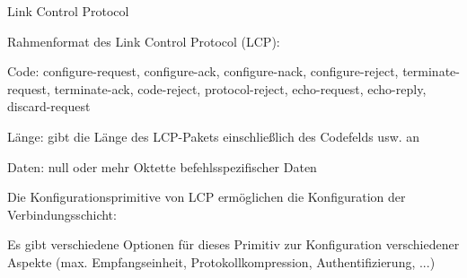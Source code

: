 \documentclass[a4paper]{article}
\begin{document}
\begin{multicols}{3}
      Link Control Protocol
      \begin{itemize*}
            \item Rahmenformat des Link Control Protocol (LCP):
            \begin{itemize*}
                  \item Code: configure-request, configure-ack, configure-nack, configure-reject, terminate-request, terminate-ack, code-reject, protocol-reject, echo-request, echo-reply, discard-request
                  \item Länge: gibt die Länge des LCP-Pakets einschließlich des Codefelds usw. an
                  \item Daten: null oder mehr Oktette befehlsspezifischer Daten
            \end{itemize*}
            \item Die Konfigurationsprimitive von LCP ermöglichen die Konfiguration der
            Verbindungsschicht:
            \begin{itemize*}
                  \item Es gibt verschiedene Optionen für dieses Primitiv zur Konfiguration verschiedener Aspekte (max. Empfangseinheit, Protokollkompression, Authentifizierung, ...)
            \end{itemize*}
      \end{itemize*}


\end{multicols}
\end{document}
